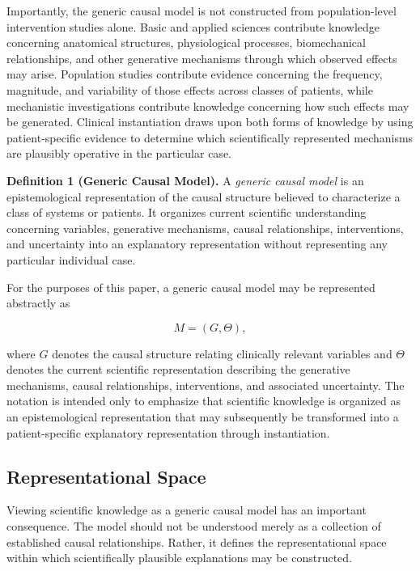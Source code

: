\documentclass[11pt]{article}
\begin{document}
Importantly, the generic causal model is not constructed from population-level intervention studies alone. Basic and applied sciences contribute knowledge concerning anatomical structures, physiological processes, biomechanical relationships, and other generative mechanisms through which observed effects may arise. Population studies contribute evidence concerning the frequency, magnitude, and variability of those effects across classes of patients, while mechanistic investigations contribute knowledge concerning how such effects may be generated. Clinical instantiation draws upon both forms of knowledge by using patient-specific evidence to determine which scientifically represented mechanisms are plausibly operative in the particular case.

\medskip

\noindent\textbf{Definition 1 (Generic Causal Model).}
A \emph{generic causal model} is an epistemological representation of the causal structure believed to characterize a class of systems or patients. It organizes current scientific understanding concerning variables, generative mechanisms, causal relationships, interventions, and uncertainty into an explanatory representation without representing any particular individual case.

For the purposes of this paper, a generic causal model may be represented abstractly as

\[
M=(G,\Theta),
\]

where $G$ denotes the causal structure relating clinically relevant variables and $\Theta$ denotes the current scientific representation describing the generative mechanisms, causal relationships, interventions, and associated uncertainty. The notation is intended only to emphasize that scientific knowledge is organized as an epistemological representation that may subsequently be transformed into a patient-specific explanatory representation through instantiation.

\subsection{Representational Space}

Viewing scientific knowledge as a generic causal model has an important consequence. The model should not be understood merely as a collection of established causal relationships. Rather, it defines the representational space within which scientifically plausible explanations may be constructed.
\end{document}
